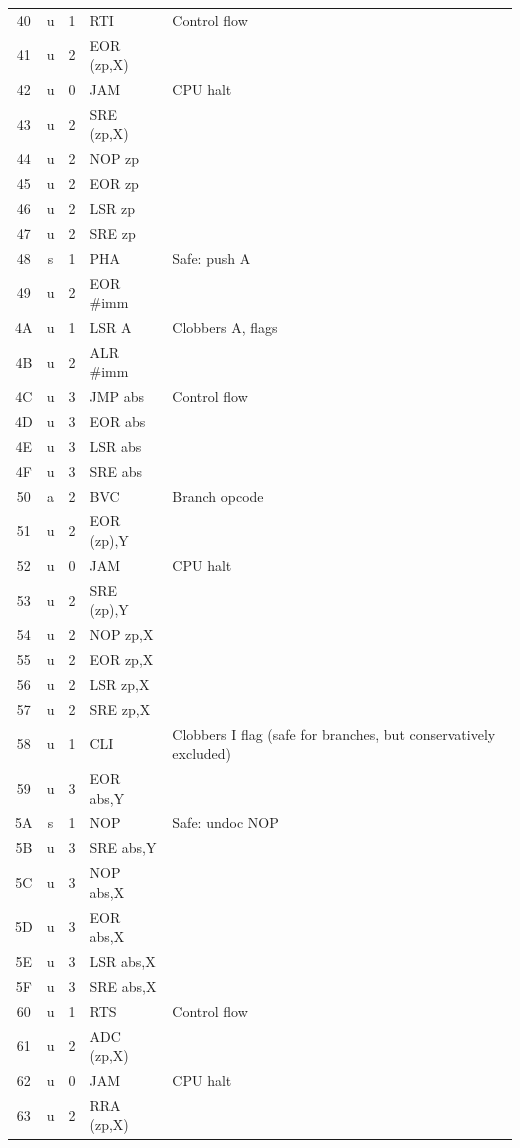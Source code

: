 \documentclass{article}
\begin{document}
{\begin{longtable}{@{}ccclp{4.8cm}@{}}
40 & u  & 1 & RTI & Control flow \\
41 & u  & 2 & EOR (zp,X) & \\
42 & u  & 0 & JAM & CPU halt \\
43 & u  & 2 & SRE (zp,X) & \\
44 & u  & 2 & NOP zp & \\
45 & u  & 2 & EOR zp & \\
46 & u  & 2 & LSR zp & \\
47 & u  & 2 & SRE zp & \\
48 & s  & 1 & PHA & Safe: push A \\
49 & u  & 2 & EOR \#imm & \\
4A & u  & 1 & LSR A & Clobbers A, flags \\
4B & u  & 2 & ALR \#imm & \\
4C & u  & 3 & JMP abs & Control flow \\
4D & u  & 3 & EOR abs & \\
4E & u  & 3 & LSR abs & \\
4F & u  & 3 & SRE abs & \\
50 & a  & 2 & BVC & Branch opcode \\
51 & u  & 2 & EOR (zp),Y & \\
52 & u  & 0 & JAM & CPU halt \\
53 & u  & 2 & SRE (zp),Y & \\
54 & u  & 2 & NOP zp,X & \\
55 & u  & 2 & EOR zp,X & \\
56 & u  & 2 & LSR zp,X & \\
57 & u  & 2 & SRE zp,X & \\
58 & u  & 1 & CLI & Clobbers I flag (safe for branches, but conservatively excluded) \\
59 & u  & 3 & EOR abs,Y & \\
5A & s  & 1 & NOP & Safe: undoc NOP \\
5B & u  & 3 & SRE abs,Y & \\
5C & u  & 3 & NOP abs,X & \\
5D & u  & 3 & EOR abs,X & \\
5E & u  & 3 & LSR abs,X & \\
5F & u  & 3 & SRE abs,X & \\
60 & u  & 1 & RTS & Control flow \\
61 & u  & 2 & ADC (zp,X) & \\
62 & u  & 0 & JAM & CPU halt \\
63 & u  & 2 & RRA (zp,X) & \\

\end{longtable}}
\end{document}
